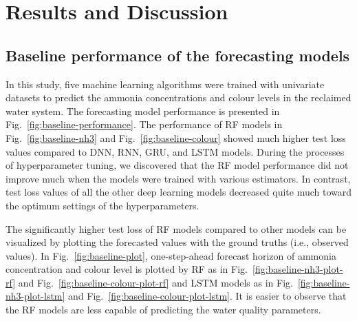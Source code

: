 \chapter{Results and Discussion}
\section{Baseline performance of the forecasting models}
In this study, five machine learning algorithms were trained with univariate datasets to predict the ammonia concentrations and colour levels in the reclaimed water system. The forecasting model performance is presented in Fig.~\ref{fig:baseline-performance}. The performance of RF models in Fig.~\ref{fig:baseline-nh3} and Fig.~\ref{fig:baseline-colour} showed much higher test loss values compared to DNN, RNN, GRU, and LSTM models. During the processes of hyperparameter tuning, we discovered that the RF model performance did not improve much when the models were trained with various estimators. In contrast, test loss values of all the other deep learning models decreased quite much toward the optimum settings of the hyperparameters.

The significantly higher test loss of RF models compared to other models can be visualized by plotting the forecasted values with the ground truths (i.e., observed values). In Fig.~\ref{fig:baseline-plot}, one-step-ahead forecast horizon of ammonia concentration and colour level is plotted by RF as in Fig.~\ref{fig:baseline-nh3-plot-rf} and Fig.~\ref{fig:baseline-colour-plot-rf} and LSTM models as in Fig.~\ref{fig:baseline-nh3-plot-lstm} and Fig.~\ref{fig:baseline-colour-plot-lstm}. It is easier to observe that the RF models are less capable of predicting the water quality parameters. 

